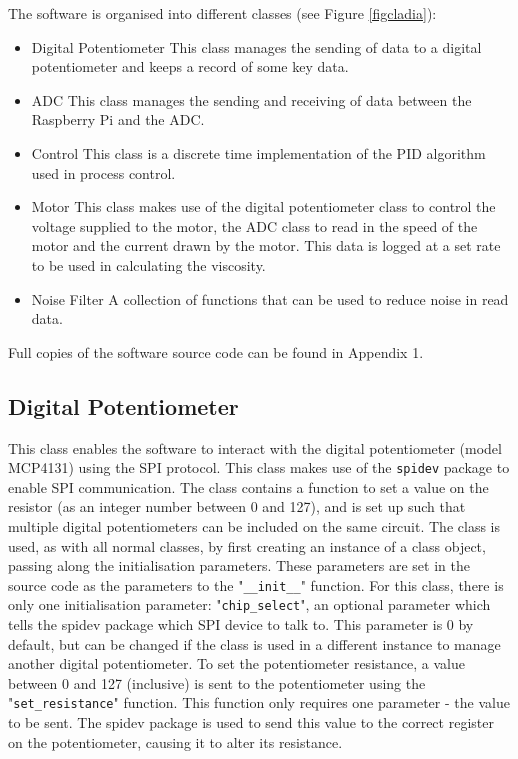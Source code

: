 \documentclass[twoside,a4]{report}
\def\br{\newline \newline \noindent}
\begin{document}
	\noindent
	The software is organised into different classes (see Figure \ref{figcladia}):
	\begin{itemize}
		\item Digital Potentiometer \newline 
		This class manages the sending of data to a digital potentiometer and keeps a record of some key data.
		\item ADC \newline 
		This class manages the sending and receiving of data between the Raspberry Pi and the ADC.
		\item Control\newline 
		This class is a discrete time implementation of the PID algorithm used in process control.
		\item Motor \newline
		This class makes use of the digital potentiometer class to control the voltage supplied to the motor, the ADC class to read in the speed of the motor and the current drawn by the motor. This data is logged at a set rate to be used in calculating the viscosity.
		\item Noise Filter \newline
		A collection of functions that can be used to reduce noise in read data.
	\end{itemize}
	Full copies of the software source code can be found in Appendix 1.
	
	\subsection*{Digital Potentiometer} %
	This class enables the software to interact with the digital potentiometer (model MCP4131) using the SPI protocol. This class makes use of the \texttt{spidev} package to enable SPI communication. The class contains a function to set a value on the resistor (as an integer number between 0 and 127), and is set up such that multiple digital potentiometers can be included on the same circuit.
	\br
	The class is used, as with all normal classes, by first creating an instance of a class object, passing along the initialisation parameters. These parameters are set in the source code as the parameters to the "\texttt{\_\_init\_\_}" function. For this class, there is only one initialisation parameter: "\texttt{chip\_select}", an optional parameter which tells the spidev package which SPI device to talk to. This parameter is 0 by default, but can be changed if the class is used in a different instance to manage another digital potentiometer.
	\br
	To set the potentiometer resistance, a value between 0 and 127 (inclusive) is sent to the potentiometer using the "\texttt{set\_resistance}" function. This function only requires one parameter - the value to be sent. The spidev package is used to send this value to the correct register on the potentiometer, causing it to alter its resistance.
	
\end{document}
